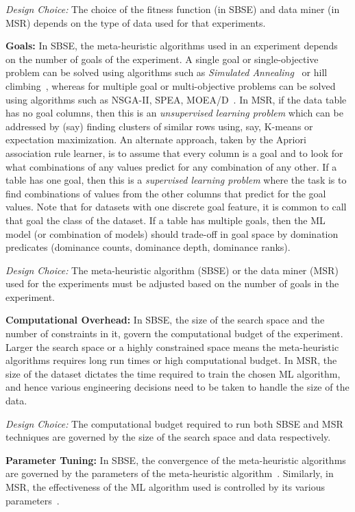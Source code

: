 \documentclass[table, xcdraw, sigconf,review, anonymous]{acmart}
\begin{document}
\noindent\textit{Design Choice:} The choice of the fitness function (in SBSE) and data miner (in MSR) depends on the type of data used for that experiments. 

\noindent\textbf{Goals:} In SBSE, the meta-heuristic algorithms used in an experiment depends on the number of goals of the experiment. A single goal or single-objective problem can be solved using algorithms such as \textit{Simulated Annealing}~\cite{van1987simulated} or hill climbing~\cite{rudlof1997stochastic}, whereas for multiple goal or multi-objective problems can be solved using algorithms such as NSGA-II, SPEA, MOEA/D~\cite{zhang2007moea}. In MSR, if the data table has no goal columns, then this is an \textit{unsupervised learning problem} which can be addressed by (say) finding clusters of similar rows using, say, K-means or expectation maximization. An alternate approach, taken by the Apriori association rule learner, is to assume that every column is a goal and to look for what combinations of any values predict for any combination of any other. If a table has one goal, then this is a \textit{supervised learning problem} where the task is to find combinations of values from the other columns that predict for the goal values. Note that for datasets with one discrete goal feature, it is common to call that goal the class of the dataset. If a table has multiple goals, then the ML model (or combination of models) should trade-off in goal space by domination predicates (dominance counts, dominance depth, dominance ranks).

\noindent\textit{Design Choice:} The meta-heuristic algorithm (SBSE) or the data miner (MSR) used for the experiments must be adjusted based on the number of goals in the experiment.

\noindent\textbf{Computational Overhead:} In SBSE, the size of the search space and the number of constraints in it, govern the computational budget of the experiment. Larger the search space or a highly constrained space means the meta-heuristic algorithms requires long run times or high computational budget. In MSR, the size of the dataset dictates the time required to train the chosen ML algorithm, and hence various engineering decisions need to be taken to handle the size of the data. 

\noindent\textit{Design Choice:} The computational budget required to run both SBSE and MSR techniques are governed by the size of the search space and data respectively.

\noindent\textbf{Parameter Tuning:} In SBSE, the convergence of the meta-heuristic algorithms are governed by the parameters of the meta-heuristic algorithm~\cite{eiben2011parameter}. Similarly, in MSR, the effectiveness of the ML algorithm used is controlled by its various parameters~\cite{fu2016tuning, fu2016differential, tantithamthavorn2016automated}. 
\end{document}
